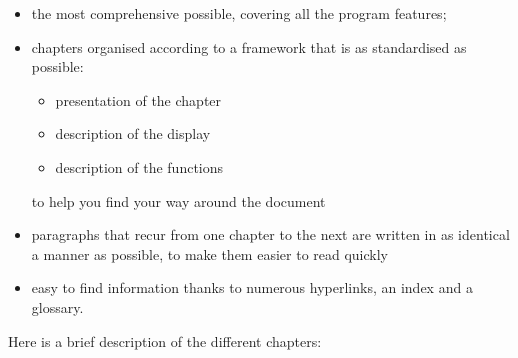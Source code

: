 \begin{itemize}
	\item the most comprehensive possible, covering all the program features;
	\item chapters organised according to a framework that is as standardised as possible:
		\begin{itemize}
			\item[\textopenbullet] presentation of the chapter
			\item[\textopenbullet] description of the display
			\item[\textopenbullet] description of the functions
		\end{itemize}
		to help you find your way around the document	 
	\item paragraphs that recur from one chapter to the next are written in as identical a manner as possible, to make them easier to read quickly
	\item easy to find information thanks to numerous \gls{hyperlinks}, an index and a glossary.
\end{itemize}



Here is a brief description of the different chapters:


